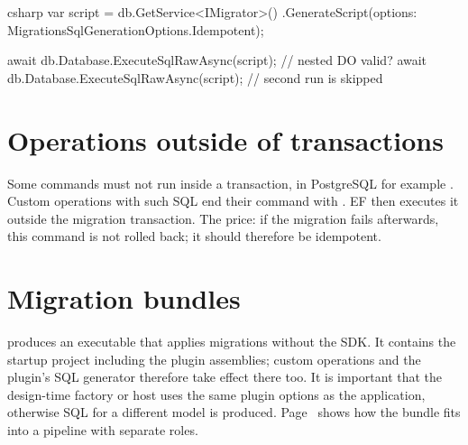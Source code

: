\begin{sourcecode}{csharp}
var script = db.GetService<IMigrator>()
    .GenerateScript(options: MigrationsSqlGenerationOptions.Idempotent);

await db.Database.ExecuteSqlRawAsync(script);   // nested DO valid?
await db.Database.ExecuteSqlRawAsync(script);   // second run is skipped
\end{sourcecode}

\section{Operations outside of transactions}

Some commands must not run inside a transaction, in PostgreSQL for example . Custom operations with such SQL end their command with
. EF then executes it outside the migration
transaction. The price: if the migration fails afterwards, this command is not rolled back;
it should therefore be idempotent.

\section{Migration bundles}

 produces an executable that applies migrations without
the SDK. It contains the startup project including the plugin assemblies; custom operations
and the plugin's SQL generator therefore take effect there too. It is important that the
design-time factory or host uses the same plugin options as the application, otherwise SQL
for a different model is produced. Page~\pageref{sec:deployment} shows how the bundle fits
into a pipeline with separate roles.

